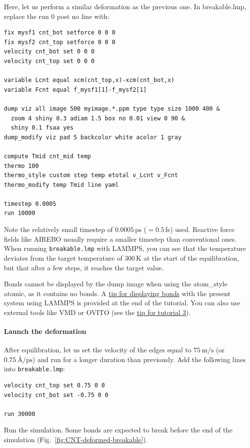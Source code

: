 \documentclass[9pt,tutorial]{livecoms}
\newcommand{\lmpcmd}[1]{\colorbox{listing}{\textcolor{command}{\small{#1}}}} %
\newcommand{\lmpcmdnote}[1]{\colorbox{note_listing}{\textcolor{command}{\small{#1}}}} %
\newcommand{\flecmd}[1]{\textcolor{command}{\texttt{#1}}} %
\begin{document}
Here, let us perform a similar deformation as the previous one.
In \lmpcmd{breakable.lmp}, replace the \lmpcmd{run 0 post no} line with:
\begin{lstlisting}
fix mysf1 cnt_bot setforce 0 0 0
fix mysf2 cnt_top setforce 0 0 0
velocity cnt_bot set 0 0 0
velocity cnt_top set 0 0 0

variable Lcnt equal xcm(cnt_top,x)-xcm(cnt_bot,x)
variable Fcnt equal f_mysf1[1]-f_mysf2[1]

dump viz all image 500 myimage.*.ppm type type size 1000 400 &
  zoom 4 shiny 0.3 adiam 1.5 box no 0.01 view 0 90 &
  shiny 0.1 fsaa yes
dump_modify viz pad 5 backcolor white acolor 1 gray

compute Tmid cnt_mid temp
thermo 100
thermo_style custom step temp etotal v_Lcnt v_Fcnt
thermo_modify temp Tmid line yaml

timestep 0.0005
run 10000
\end{lstlisting}
Note the relatively small timestep of $0.0005$\,ps ($= 0.5$\,fs) used.  Reactive force
fields like AIREBO usually require a smaller timestep than conventional ones.  When running
\flecmd{breakable.lmp} with LAMMPS, you can see that the temperature deviates
from the target temperature of $300\,\text{K}$ at the start of the equilibration,
but that after a few steps, it reaches the target value.

\begin{note}
  Bonds cannot be displayed by the \lmpcmdnote{dump image} when using
  the \lmpcmdnote{atom\_style atomic}, as it contains no bonds.  A
  \hyperref[tip-dynamic-bonds]{tip for displaying bonds} with the
  present system using LAMMPS is provided at the end of the tutorial.
  You can also use external tools like VMD or OVITO (see the
  \hyperref[tip-external-viz]{tip for tutorial 3}).
\end{note}

\paragraph{Launch the deformation}

After equilibration, let us set the velocity of the edges equal to
$75~\text{m/s}$ (or $0.75~\text{\AA{}/ps}$) and run for a longer duration than
previously.  Add the following lines into \flecmd{breakable.lmp}:
\begin{lstlisting}
velocity cnt_top set 0.75 0 0
velocity cnt_bot set -0.75 0 0

run 30000
\end{lstlisting}
Run the simulation.  Some bonds are expected to break before the end of the
simulation (Fig.~\ref{fig:CNT-deformed-breakable}).
\end{document}
